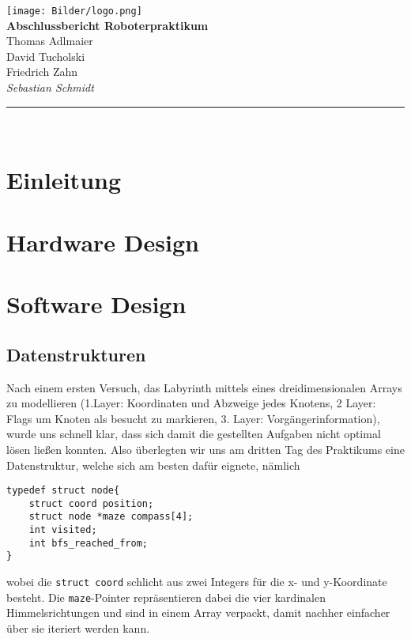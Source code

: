 \documentclass[a4paper, 12pt]{scrartcl}
\begin{document}
\begin{titlepage}
\begin{center}
\texttt{[image: Bilder/logo.png]}\\[2.3cm]
{\huge\textsf{\textbf{ Abschlussbericht Roboterpraktikum}}}\\[1.5cm]
{\Large Thomas Adlmaier\\ David Tucholski\\ Friedrich Zahn\\[7pt]\emph{Sebastian Schmidt}}\\[1cm]
\rule{\linewidth}{.5mm}\\[1.7cm]
\end{center}
\tableofcontents
\end{titlepage}

\section{Einleitung}

\section{Hardware Design}

\section{Software Design}
\subsection{Datenstrukturen}
Nach einem ersten Versuch, das Labyrinth mittels eines  dreidimensionalen Arrays zu modellieren (1.Layer: Koordinaten und Abzweige jedes Knotens, 2 Layer: Flags um Knoten als besucht zu markieren, 3. Layer: Vorgängerinformation), wurde uns schnell klar, dass sich damit die gestellten Aufgaben nicht optimal lösen ließen konnten. Also überlegten wir uns am dritten Tag des Praktikums eine Datenstruktur, welche sich am besten dafür eignete, nämlich


\begin{lstlisting}
typedef struct node{
	struct coord position;
	struct node *maze compass[4];
	int visited;
	int bfs_reached_from;
} 
\end{lstlisting}

wobei die \lstinline$struct coord$ schlicht aus zwei Integers für die x- und y-Koordinate besteht. Die \lstinline$maze$-Pointer repräsentieren dabei die vier kardinalen Himmelsrichtungen und sind in einem Array verpackt, damit nachher einfacher über sie iteriert werden kann.
\end{document}
